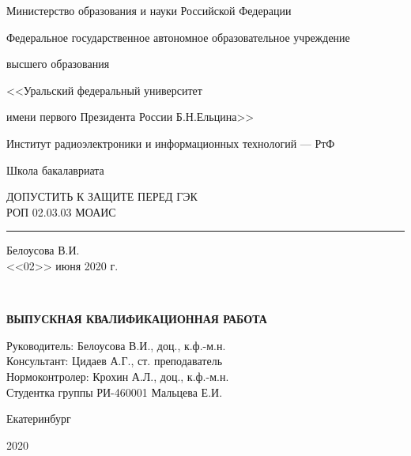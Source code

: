 {\small
	\centerline{Министерство образования и науки Российской Федерации}
	\centerline{Федеральное государственное автономное образовательное учреждение}
	\centerline{высшего образования}
	\centerline{\normalsize<<Уральский федеральный университет}
	\centerline{\normalsize имени первого Президента России Б.Н.Ельцина>>}
	\vskip0.5cm
	\centerline{\normalsize Институт радиоэлектроники и информационных технологий --- РтФ}
	\vskip0.2cm
	\centerline{\normalsize Школа бакалавриата}
}
\vskip1cm

\null\hfill
\begin{minipage}{0.65\textwidth}
	\hfill ДОПУСТИТЬ К ЗАЩИТЕ ПЕРЕД ГЭК
	\hfill \\\phantom{XXXXXXXXXXXXXX} РОП 02.03.03 МОАИС
	\hfill \\\phantom{XXXXXXXX} \rule[-1pt]{3.7cm}{0.4pt} Белоусова В.И.%
	\hfill \\\phantom{XXXXXXXXXXXXXXXXX} <<02>> июня 2020 г.
\end{minipage}\\
\vskip1cm
\centerline{{\bf ВЫПУСКНАЯ КВАЛИФИКАЦИОННАЯ РАБОТА}}
\vskip0.5cm
\vskip0.2cm

\vskip3cm
\noindent
Руководитель: Белоусова В.И., доц., к.ф.-м.н.\hfill \\ %
Консультант: Цидаев А.Г., ст. преподаватель \hfill \\ %
Нормоконтролер: Крохин А.Л., доц., к.ф.-м.н. \hfill \\ %
Студентка группы РИ-460001 Мальцева Е.И. \hfill \\ %
\vfill
\centerline{Екатеринбург}
\centerline{2020}
